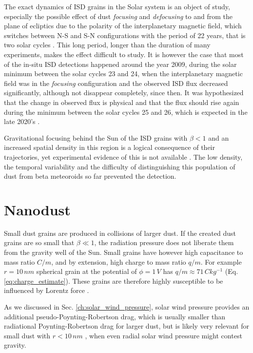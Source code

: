 The exact dynamics of ISD grains in the Solar system is an object of study, especially the possible effect of dust \textit{focusing} and \textit{defocusing} to and from the plane of ecliptics due to the polarity of the interplanetary magnetic field, which switches between N-S and S-N configurations with the period of 22 years, that is two solar cycles \citep{morfill1979motion}. This long period, longer than the duration of many experiments, makes the effect difficult to study. It is however the case that most of the in-situ ISD detections happened around the year 2009, during the solar minimum between the solar cycles 23 and 24, when the interplanetary magnetic field was in the \textit{focusing} configuration \citep{babic2022situ} and the observed ISD flux decreased significantly, although not disappear completely, since then. It was hypothesized that the change in observed flux is physical and that the flux should rise again during the minimum between the solar cycles 25 and 26, which is expected in the late 2020's \citep{mann2010interstellar}. 

Gravitational focusing behind the Sun of the ISD grains with $\beta < 1$ and an increased spatial density in this region is a logical consequence of their trajectories, yet experimental evidence of this is not available \citep{mann2010interstellar}. The low density, the temporal variability and the difficulty of distinguishing this population of dust from beta meteoroids so far prevented the detection.

\section{Nanodust}

Small dust grains are produced in collisions of larger dust. If the created dust grains are so small that $\beta \ll 1$, the radiation pressure does not liberate them from the gravity well of the Sun. Small grains have however high capacitance to mass ratio $C/m$, and by extension, high charge to mass ratio $q/m$. For example $r = 10 \, \si{nm}$ spherical grain at the potential of $\phi = 1 \, \si{V}$ has $q/m \approx 71 \, \si{Ckg^{-1}}$ (Eq. \ref{eq:charge_estimate}). These grains are therefore highly susceptible to be influenced by Lorentz force \citep{czechowski2010formation}. 

As we discussed in Sec. \ref{ch:solar_wind_pressure}, solar wind pressure provides an additional pseudo-Poynting-Robertson drag, which is usually smaller than radiational Poynting-Robertson drag for larger dust, but is likely very relevant for small dust with $r<10\, \si{nm}$ \citep{mukai1982solar}, when even radial solar wind pressure might contest gravity. 

